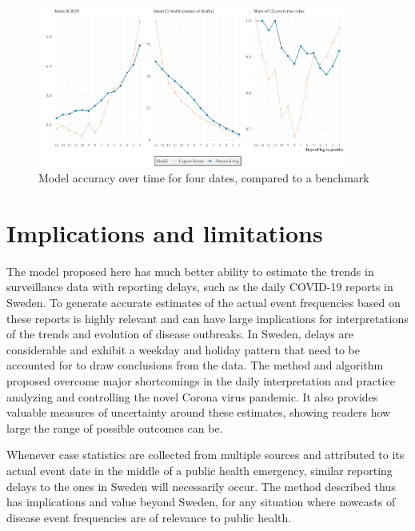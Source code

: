 \documentclass[a4paper,11pt,article,oneside,openany,american]{memoir}
\begin{document}
\begin{figure}
    \centering
    \includegraphics[width=0.9\textwidth]{../plots/model_metrics}
    \caption{Model accuracy over time for four dates, compared to a benchmark}
    \label{fig:model_metrics}
\end{figure}

\chapter{Implications and limitations}
The model proposed here has much better ability to estimate the trends in surveillance data with reporting delays, such as the daily COVID-19 reports in Sweden. To generate accurate estimates of the actual event frequencies based on these reports is highly relevant and can have large implications for interpretations of the trends and evolution of disease outbreaks. In Sweden, delays are considerable and exhibit a weekday and holiday pattern that need to be accounted for to draw conclusions from the data. The method and algorithm proposed overcome major shortcomings in the daily interpretation and practice analyzing and controlling the novel Corona virus pandemic. It also provides valuable measures of uncertainty around these estimates, showing readers how large the range of possible outcomes can be.

Whenever case statistics are collected from multiple sources and attributed to its actual event date in the middle of a public health emergency, similar reporting delays to the ones in Sweden will necessarily occur. The method described thus has implications and value beyond Sweden, for any situation where nowcasts of disease event frequencies are of relevance to public health.
\end{document}
